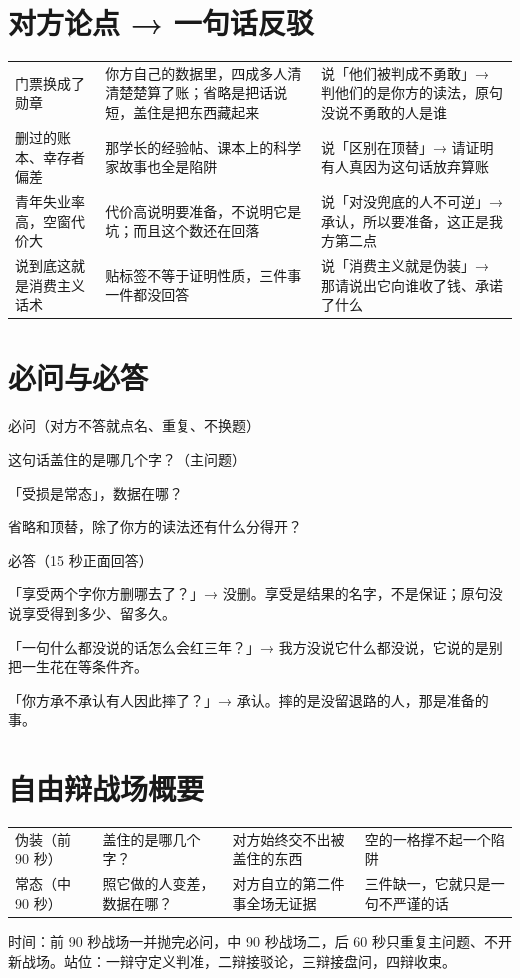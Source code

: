 \documentclass[quick,con]{debate}
\begin{document}
\section{对方论点 → 一句话反驳}
\begin{tabularx}{\linewidth}{@{}Y Y Y@{}}\toprule
{}&&\\\midrule
门票换成了勋章&你方自己的数据里，四成多人清清楚楚算了账；省略是把话说短，盖住是把东西藏起来&说「他们被判成不勇敢」→ 判他们的是你方的读法，原句没说不勇敢的人是谁\\
删过的账本、幸存者偏差&那学长的经验帖、课本上的科学家故事也全是陷阱&说「区别在顶替」→ 请证明有人真因为这句话放弃算账\\
青年失业率高，空窗代价大&代价高说明要准备，不说明它是坑；而且这个数还在回落&说「对没兜底的人不可逆」→ 承认，所以要准备，这正是我方第二点\\
说到底这就是消费主义话术&贴标签不等于证明性质，三件事一件都没回答&说「消费主义就是伪装」→ 那请说出它向谁收了钱、承诺了什么\\
\bottomrule\end{tabularx}

\section{必问与必答}
\begin{points}{必问（对方不答就点名、重复、不换题）}
\item 这句话盖住的是哪几个字？（主问题）
\item 「受损是常态」，数据在哪？
\item 省略和顶替，除了你方的读法还有什么分得开？
\end{points}
\begin{points}{必答（15 秒正面回答）}
\item 「享受两个字你方删哪去了？」→ 没删。享受是结果的名字，不是保证；原句没说享受得到多少、留多久。
\item 「一句什么都没说的话怎么会红三年？」→ 我方没说它什么都没说，它说的是别把一生花在等条件齐。
\item 「你方承不承认有人因此摔了？」→ 承认。摔的是没留退路的人，那是准备的事。
\end{points}

\section{自由辩战场概要}
\begin{tabularx}{\linewidth}{@{}L{4.2em}Y Y Y@{}}\toprule
{}&&&\\\midrule
伪装（前 90 秒）&盖住的是哪几个字？&对方始终交不出被盖住的东西&空的一格撑不起一个陷阱\\
常态（中 90 秒）&照它做的人变差，数据在哪？&对方自立的第二件事全场无证据&三件缺一，它就只是一句不严谨的话\\
\bottomrule\end{tabularx}
时间：前 90 秒战场一并抛完必问，中 90 秒战场二，后 60 秒只重复主问题、不开新战场。站位：一辩守定义判准，二辩接驳论，三辩接盘问，四辩收束。
\end{document}
